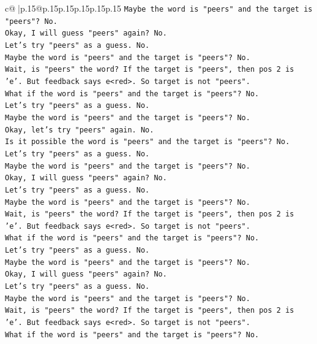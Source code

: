 \documentclass{article}
\begin{document}
{\begin{supertabular}{c@{$\;$}|p{.15\linewidth}@{}p{.15\linewidth}p{.15\linewidth}p{.15\linewidth}p{.15\linewidth}p{.15\linewidth}}
{{{\texttt{Maybe the word is "peers" and the target is "peers"? No.} \\
\texttt{Okay, I will guess "peers" again? No.} \\
\texttt{Let's try "peers" as a guess. No.} \\
\texttt{Maybe the word is "peers" and the target is "peers"? No.} \\
\texttt{Wait, is "peers" the word? If the target is "peers", then pos 2 is 'e'. But feedback says e<red>. So target is not "peers".} \\
\texttt{What if the word is "peers" and the target is "peers"? No.} \\
\texttt{Let's try "peers" as a guess. No.} \\
\texttt{Maybe the word is "peers" and the target is "peers"? No.} \\
\texttt{Okay, let's try "peers" again. No.} \\
\texttt{Is it possible the word is "peers" and the target is "peers"? No.} \\
\texttt{Let's try "peers" as a guess. No.} \\
\texttt{Maybe the word is "peers" and the target is "peers"? No.} \\
\texttt{Okay, I will guess "peers" again? No.} \\
\texttt{Let's try "peers" as a guess. No.} \\
\texttt{Maybe the word is "peers" and the target is "peers"? No.} \\
\texttt{Wait, is "peers" the word? If the target is "peers", then pos 2 is 'e'. But feedback says e<red>. So target is not "peers".} \\
\texttt{What if the word is "peers" and the target is "peers"? No.} \\
\texttt{Let's try "peers" as a guess. No.} \\
\texttt{Maybe the word is "peers" and the target is "peers"? No.} \\
\texttt{Okay, I will guess "peers" again? No.} \\
\texttt{Let's try "peers" as a guess. No.} \\
\texttt{Maybe the word is "peers" and the target is "peers"? No.} \\
\texttt{Wait, is "peers" the word? If the target is "peers", then pos 2 is 'e'. But feedback says e<red>. So target is not "peers".} \\
\texttt{What if the word is "peers" and the target is "peers"? No.} \\
}}}
\end{supertabular}}
\end{document}
